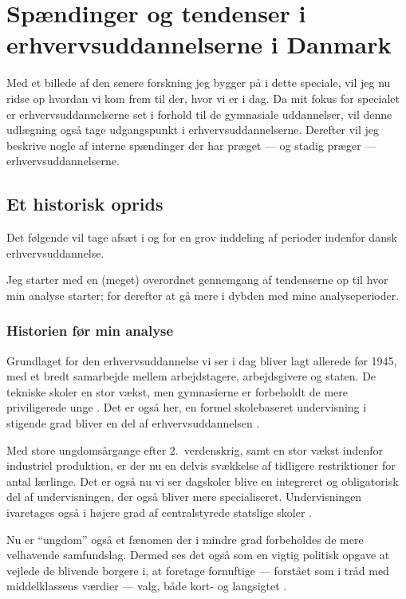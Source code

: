 \chapter{Spændinger og tendenser i erhvervsuddannelserne i Danmark}
Med et billede af den senere forskning jeg bygger på i dette speciale, vil jeg nu ridse op hvordan vi kom frem til der, hvor vi er i dag.
Da mit fokus for specialet er erhvervsuddannelserne set i forhold til de gymnasiale uddannelser, vil denne udlægning også tage udgangspunkt i erhvervsuddannelserne.
Derefter vil jeg beskrive nogle af interne spændinger der har præget — og stadig præger — erhvervsuddannelserne.

\section{Et historisk oprids}

Det følgende vil tage afsæt i \cite{bondergaardHistoricalEmergenceKey2014} og \cite{juulDiskurserOmUngdom2013} for en grov inddeling af perioder indenfor dansk erhvervsuddannelse.

Jeg starter med en (meget) overordnet gennemgang af tendenserne op til hvor min analyse starter; for derefter at gå mere i dybden med mine analyseperioder.

\subsection{Historien før min analyse}

 Grundlaget for den erhvervsuddannelse vi ser i dag bliver lagt allerede før 1945, med et bredt samarbejde mellem arbejdstagere, arbejdsgivere og staten.
De tekniske skoler en stor vækst, men gymnasierne er forbeholdt de mere priviligerede unge \autocite[s. 9]{bondergaardHistoricalEmergenceKey2014}.
Det er også her, en formel skolebaseret undervisning i stigende grad bliver en del af erhvervsuddannelsen \autocite[s. 15ff]{bondergaardHistoricalEmergenceKey2014}. 

Med store ungdomsårgange efter 2.\ verdenskrig, samt en stor vækst indenfor industriel produktion, er der nu en delvis svækkelse af tidligere restriktioner for antal lærlinge.
Det er også nu vi ser dagskoler blive en integreret og obligatorisk del af undervisningen, der også bliver mere specialiseret.
Undervisningen ivaretages også i højere grad af centralstyrede statslige skoler \autocite[s. 35]{bondergaardHistoricalEmergenceKey2014}.

Nu er “ungdom” også et fænomen der i mindre grad forbeholdes de mere velhavende samfundslag.
Dermed ses det også som en vigtig politisk opgave at vejlede de blivende borgere i, at foretage fornuftige — forstået som i tråd med middelklassens værdier — valg, både kort- og langsigtet \autocite[s. 13ff]{juulDiskurserOmUngdom2013}.

